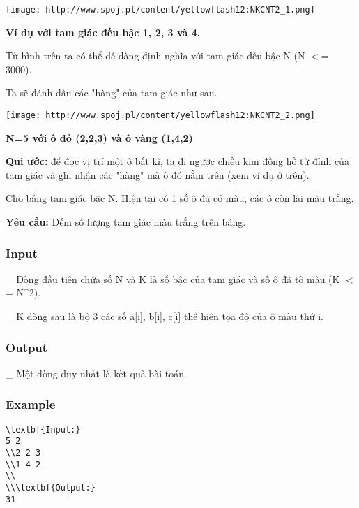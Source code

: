 




\texttt{[image: http://www.spoj.pl/content/yellowflash12:NKCNT2\_1.png]}

\textbf{    Ví dụ với tam giác đều bậc 1, 2, 3 và 4.   }

   Từ hình trên ta có thể dễ dàng định nghĩa với tam giác đều bậc N (N $<$= 3000).  

   Ta sẽ đánh dấu các "hàng" của tam giác như sau.  


\texttt{[image: http://www.spoj.pl/content/yellowflash12:NKCNT2\_2.png]}

\textbf{    N=5 với ô đỏ (2,2,3) và ô vàng (1,4,2)   }

\textbf{    Qui ước:   }   để đọc vị trí một ô bất kì, ta đi ngược chiều kim đồng hồ từ đỉnh của tam giác và ghi nhận các "hàng" mà ô đó nằm trên (xem ví dụ ở trên).  

   Cho bảng tam giác bậc N. Hiện tại có 1 số ô đã có màu, các ô còn lại màu trắng.  

\textbf{    Yêu cầu:   }   Đếm số lượng tam giác màu trắng trên bảng.  

\subsubsection{   Input  }

   \_ Dòng đầu tiên chứa số N và K là số bậc của tam giác và số ô đã tô màu (K $<$= N\textasciicircum2).  

   \_ K dòng sau là bộ 3 các số a[i], b[i], c[i] thể hiện tọa độ của ô màu thứ i.  

\subsubsection{   Output  }

   \_ Một dòng duy nhất là kết quả bài toán.  

\subsubsection{   Example  }
\begin{verbatim}
\textbf{Input:}
5 2
\\2 2 3
\\1 4 2
\\
\\\textbf{Output:}
31
\end{verbatim}